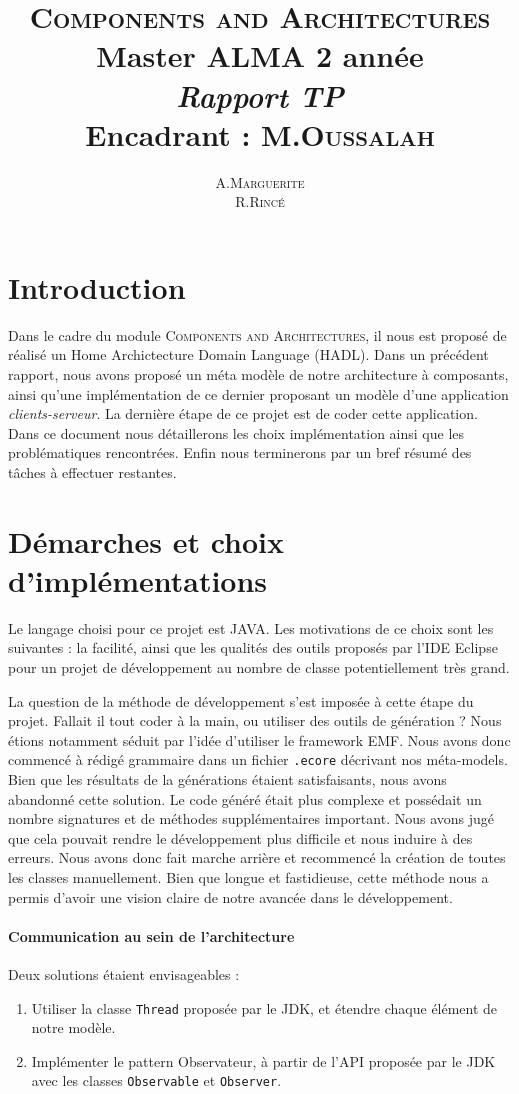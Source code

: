 \documentclass[12pt]{article}
\title{ {\huge \textsc{Components and Architectures}} \\  Master ALMA 2\up{eme} année  \\ \emph{Rapport TP}\\{\small Encadrant :  M.\textsc{Oussalah}}}
\author{A.\textsc{Marguerite} \\ R.\textsc{Rincé}}
\begin{document}
\maketitle
\renewcommand{\labelitemi}{$\bullet$} 



\section{Introduction}\label{sec:intro}
Dans le cadre du module \textsc{Components and Architectures}, il nous est proposé de réalisé un Home Archictecture Domain Language (HADL). Dans un précédent rapport, nous avons proposé un méta modèle de notre architecture à composants, ainsi qu'une implémentation de ce dernier proposant un modèle d'une application \textit{clients-serveur}. La dernière étape de ce projet est de coder cette application. Dans ce document nous détaillerons les choix implémentation ainsi que les problématiques rencontrées. Enfin nous terminerons par un bref résumé des tâches à effectuer restantes.
\section{Démarches et choix d'implémentations}\label{sec:pblm}
Le langage choisi pour ce projet est JAVA. Les motivations de ce choix sont les suivantes : la facilité, ainsi que les qualités des outils proposés par l'IDE Eclipse pour un projet de développement au nombre de classe potentiellement très grand. 

La question de la méthode de développement s'est imposée à cette étape du projet. Fallait il tout coder à la main, ou utiliser des outils de génération ? Nous étions notamment séduit par l'idée d'utiliser le framework EMF. Nous avons donc commencé à rédigé grammaire dans un fichier \verb+.ecore+ décrivant nos méta-models. Bien que les résultats de la générations étaient satisfaisants, nous avons abandonné cette solution. Le code généré était plus complexe et possédait un nombre signatures et de méthodes supplémentaires important. Nous avons jugé que cela pouvait rendre le développement plus difficile et nous induire  à des erreurs. Nous avons donc fait marche arrière et recommencé la création de toutes les classes manuellement. Bien que longue et fastidieuse, cette méthode nous a permis d'avoir une vision claire de notre avancée dans le développement.

\paragraph{Communication au sein de l'architecture}
Deux solutions étaient envisageables :
\begin{enumerate}
\item
  Utiliser la classe \verb+Thread+ proposée par le JDK, et étendre chaque élément de notre modèle. 
\item
  Implémenter le pattern Observateur, à partir de l'API proposée par le JDK avec les classes \verb+Observable+ et \verb+Observer+.
\end{enumerate} 
\end{document}
